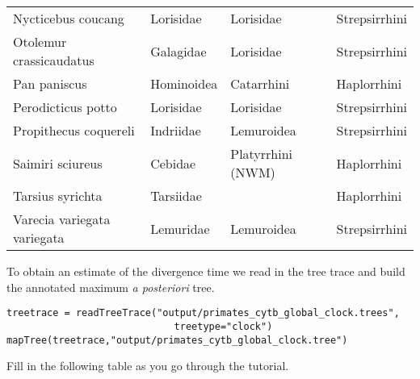 \begin{table}[h!]
\begin{tabular}{l l l l}
Nycticebus coucang & Lorisidae & Lorisidae & Strepsirrhini \\
Otolemur crassicaudatus & Galagidae & Lorisidae & Strepsirrhini \\
Pan paniscus & Hominoidea & Catarrhini & Haplorrhini \\
Perodicticus potto & Lorisidae & Lorisidae & Strepsirrhini \\
Propithecus coquereli & Indriidae & Lemuroidea & Strepsirrhini \\
Saimiri sciureus & Cebidae & Platyrrhini (NWM) & Haplorrhini \\
Tarsius syrichta & Tarsiidae &  & Haplorrhini \\
Varecia variegata variegata & Lemuridae & Lemuroidea & Strepsirrhini \\
\hline
\end{tabular}
\label{tab:primates}
\end{table}
To obtain an estimate of the divergence time we read in the tree trace and build the annotated maximum \textit{a posteriori} tree.
{\tt \begin{snugshade*}
\begin{lstlisting}
treetrace = readTreeTrace("output/primates_cytb_global_clock.trees",
                             treetype="clock")
mapTree(treetrace,"output/primates_cytb_global_clock.tree")
\end{lstlisting}
\end{snugshade*}}
Fill in the following table as you go through the tutorial.


